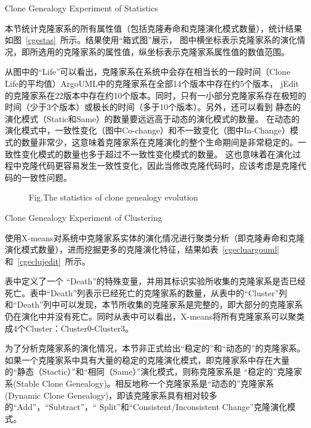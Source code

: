 {Clone Genealogy Experiment of Statistics} 

本节统计克隆家系的所有属性值（包括克隆寿命和克隆演化模式数量），统计结果如图~\ref{cgestas}~所示。结果使用“箱式图”展示， 图中横坐标表示克隆家系的演化情况，即所选用的克隆家系的属性值，纵坐标表示克隆家系属性值的数值范围。
 
从图中的“Life”可以看出，克隆家系在系统中会存在相当长的一段时间（Clone Life的平均值）ArgoUML中的克隆家系在全部14个版本中存在约5个版本， jEdit的克隆家系在22版本中存在约10个版本。同时，只有一小部分克隆家系存在极短的时间（少于3个版本）或极长的时间（多于10个版本）。另外，还可以看到 静态的演化模式（Static和Same）的数量要远远高于动态的演化模式的数量。 在动态的演化模式中，一致性变化（图中Co-change）和不一致变化（图中In-Change）模式的数量非常少，这意味着克隆家系在克隆演化的整个生命期间是非常稳定的。一致性变化模式的数量也多于超过不一致性变化模式的数量。 这也意味着在演化过程中克隆代码更容易发生一致性变化，因此当修改克隆代码时，应该考虑是克隆代码的一致性问题。

\begin{figure}[htbp]
\centering
\subfigure{\label{cgestargo}}
\addtocounter{subfigure}{-2}
\subfigure{\label{cgestjedit}}
\addtocounter{subfigure}{-2}
{Fig.$\!$}{The statistics of clone genealogy evolution}
\vspace{-1em}
\end{figure}
 
{Clone Genealogy Experiment of Clustering} 

使用X-means对系统中克隆家系实体的演化情况进行聚类分析（即克隆寿命和克隆演化模式数量），进而挖掘更多的克隆演化特征，结果如表~\ref{cgecluargouml}和~\ref{cgeclujedit}~所示。

表中定义了一个 “Death”的特殊变量，并用其标识实验所收集的克隆家系是否已经死亡。表中“Death”列表示已经死亡的克隆家系的数量，从表中的“Cluster”列和“Death”列中可以发现，本节所收集的克隆家系是完整的，即大部分的克隆家系仍在演化中并没有死亡。同时从表中可以看出，X-means将所有克隆家系可以聚类成4个Cluster：Cluster0-Cluster3。

为了分析克隆家系的演化情况，本节非正式给出“稳定的”和“动态的”的克隆家系。如果一个克隆家系中具有大量的稳定的克隆演化模式，即克隆家系中存在大量的“静态（Stactic）”和“相同（Same）”演化模式，则称克隆家系是 “稳定的”克隆家系(Stable Clone Genealogy)。相反地称一个克隆家系是“动态的”克隆家系(Dynamic Clone Genealogy)，即该克隆家系具有相对较多的“Add”，“Subtract”，“ Split”和“Consistent/Inconsistent Change”克隆演化模式。


